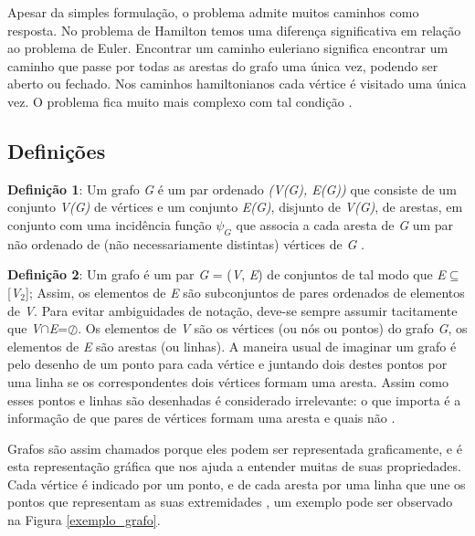 Apesar da simples formulação, o problema admite muitos caminhos como resposta. No problema de Hamilton temos uma diferença significativa em relação ao problema de Euler. Encontrar um caminho euleriano significa encontrar um caminho que passe por todas as arestas do grafo uma única vez, podendo ser aberto ou fechado. Nos caminhos hamiltonianos cada vértice é visitado uma única vez. O problema fica muito mais complexo com tal condição \cite{Costa:2011}.

\subsection{Definições}

\textbf{Definição 1}: Um grafo \textit{G} é um par ordenado \textit{(V(G), E(G))} que consiste de um conjunto \textit{V(G)} de vértices e um conjunto \textit{E(G)}, disjunto de \textit{V(G)}, de arestas, em conjunto com uma incidência função $\psi_G$ que associa a cada aresta de \textit{G} um par não ordenado de (não necessariamente distintas) vértices de \textit{G} \cite{Bondy:2007}.

\textbf{Definição 2}: Um grafo é um par \textit{G} = (\textit{V}, \textit{E}) de conjuntos de tal modo que \textit{E}$\subseteq$[\textit{V}$_2$]; Assim, os elementos de \textit{E} são subconjuntos de pares ordenados de elementos de \textit{V}. Para evitar ambiguidades de notação, deve-se sempre assumir tacitamente que \textit{V}$\cap$\textit{E}=$\oslash$. Os elementos de \textit{V} são os vértices (ou nós ou pontos) do grafo \textit{G}, os elementos de \textit{E} são arestas (ou linhas). A maneira usual de imaginar um grafo é pelo desenho de um ponto para cada vértice e juntando dois destes pontos por uma linha se os correspondentes dois vértices formam uma aresta. Assim como esses pontos e linhas são desenhadas é considerado irrelevante: o que importa é a informação de que pares de vértices formam uma aresta e quais não \cite{Diestel:1997}.

Grafos são assim chamados porque eles podem ser representada graficamente, e é esta representação gráfica que nos ajuda a entender muitas de suas propriedades. Cada vértice é indicado por um ponto, e de cada aresta por uma linha que une os pontos que representam as suas extremidades \cite{Bondy:2007}, um exemplo pode ser observado na Figura \ref{exemplo_grafo}.


